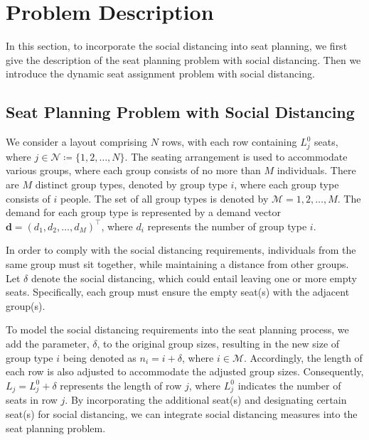\section{Problem Description}
In this section, to incorporate the social distancing into seat planning, we first give the description of the seat planning problem with social distancing. Then we introduce the dynamic seat assignment problem with social distancing.


\subsection{Seat Planning Problem with Social Distancing}\label{dynamic_demand}
We consider a layout comprising $N$ rows, with each row containing $L_j^0$ seats, where $j \in \mathcal{N} \coloneqq \{1,2, \ldots, N\}$. The seating arrangement is used to accommodate various groups, where each group consists of no more than $M$ individuals. There are $M$ distinct group types, denoted by group type $i$, where each group type consists of $i$ people. The set of all group types is denoted by $\mathcal{M} = {1, 2, \ldots, M}$. The demand for each group type is represented by a demand vector $\mathbf{d} = (d_1, d_2, \ldots, d_M)^{\intercal}$, where $d_i$ represents the number of group type $i$.

In order to comply with the social distancing requirements, individuals from the same group must sit together, while maintaining a distance from other groups. Let $\delta$ denote the social distancing, which could entail leaving one or more empty seats. Specifically, each group must ensure the empty seat(s) with the adjacent group(s).


To model the social distancing requirements into the seat planning process, we add the parameter, $\delta$, to the original group sizes, resulting in the new size of group type $i$ being denoted as $n_i = i + \delta$, where $i \in \mathcal{M}$. Accordingly, the length of each row is also adjusted to accommodate the adjusted group sizes. Consequently, $L_j = L_j^{0} + \delta$ represents the length of row $j$, where $L_j^{0}$ indicates the number of seats in row $j$. By incorporating the additional seat(s) and designating certain seat(s) for social distancing, we can integrate social distancing measures into the seat planning problem.


